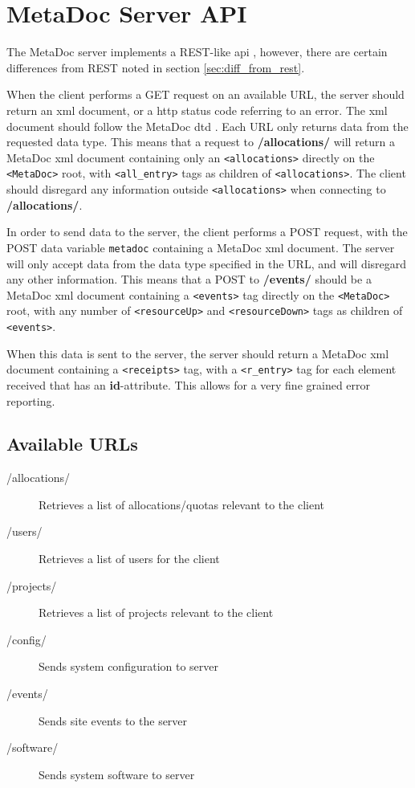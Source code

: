 \newpage
\section{MetaDoc Server API}
\label{sec:server_api}

The MetaDoc server implements a REST-like \gls{api} \cite{rest}, however, there
are certain differences from REST noted in section \ref{sec:diff_from_rest}.

When the client performs a GET request on an available URL, the server should
return an \gls{xml} document, or a \gls{http} status code referring to an
error.  The \gls{xml} document should follow the MetaDoc \gls{dtd}
\cite{metadoc_dtd}. Each URL only returns data from the requested data type.
This means that a request to \textbf{/allocations/} will return a MetaDoc
\gls{xml} document containing only an \texttt{<allocations>} directly on the
\texttt{<MetaDoc>} root, with \texttt{<all\_entry>} tags as children of
\texttt{<allocations>}.  The client should disregard any information outside
\texttt{<allocations>} when connecting to \textbf{/allocations/}. 

In order to send data to the server, the client performs a POST request, with
the POST data variable \texttt{metadoc} containing a MetaDoc \gls{xml}
document. The server will only accept data from the data type specified in the
URL, and will disregard any other information. This means that a POST to
\textbf{/events/} should be a MetaDoc \gls{xml} document containing a
\texttt{<events>} tag directly on the \texttt{<MetaDoc>} root, with any number
of \texttt{<resourceUp>} and \texttt{<resourceDown>} tags as children of
\texttt{<events>}. 

When this data is sent to the server, the server should return a MetaDoc
\gls{xml} document containing a \texttt{<receipts>} tag, with a
\texttt{<r\_entry>} tag for each element received that has an
\textbf{id}-attribute. This allows for a very fine grained error reporting.

\subsection{Available URLs}

\begin{description}
    \item[/allocations/] Retrieves a list of allocations/quotas relevant
        to the client
    \item[/users/] Retrieves a list of users for the client
    \item[/projects/] Retrieves a list of projects relevant to the
        client
    \item[/config/] Sends system configuration to server
    \item[/events/] Sends site events to the server
    \item[/software/] Sends system software to server
\end{description}

